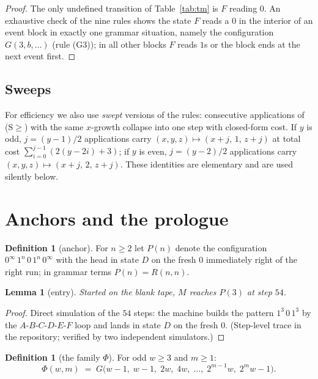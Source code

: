 \documentclass[11pt]{amsart}
\newtheorem{lemma}[theorem]{Lemma}
\theoremstyle{definition}
\newtheorem{definition}[theorem]{Definition}
\begin{document}
\begin{proof}
The only undefined transition of Table~\ref{tab:tm} is $F$ reading $0$. An
exhaustive check of the nine rules shows the state $F$ reads a $0$ in the
interior of an event block in exactly one grammar situation, namely the
configuration $G(3,b,\dots)$ (rule (G3)); in all other blocks $F$ reads
$1$s or the block ends at the next event first.
\end{proof}

\subsection{Sweeps}

For efficiency we also use \emph{swept} versions of the rules: consecutive
applications of (S$\ge$) with the same $x$-growth collapse into one step
with closed-form cost. If $y$ is odd, $j=(y-1)/2$ applications carry
$(x,y,z)\mapsto(x+j,\,1,\,z+j)$ at total cost $\sum_{i=0}^{j-1}(2(y-2i)+3)$;
if $y$ is even, $j=(y-2)/2$ applications carry $(x,y,z)\mapsto(x+j,\,2,\,z+j)$.
These identities are elementary and are used silently below.

\section{Anchors and the prologue}\label{s:prologue}

\begin{definition}[anchor]\label{def:anchor}
For $n\ge2$ let $P(n)$ denote the configuration
$0^\infty\,1^n\,0\,1^n\,0^\infty$ with the head in state $D$ on the fresh
$0$ immediately right of the right run; in grammar terms $P(n)=R(n,n)$.
\end{definition}

\begin{lemma}[entry]\label{lem:entry}
Started on the blank tape, $M$ reaches $P(3)$ at step $54$.
\end{lemma}

\begin{proof}
Direct simulation of the $54$ steps: the machine builds the pattern
$1^3\,0\,1^3$ by the $A$-$B$-$C$-$D$-$E$-$F$ loop and lands in state $D$ on
the fresh $0$. (Step-level trace in the repository; verified by two
independent simulators.)
\end{proof}

\begin{definition}[the family $\Phi$]\label{def:phi}
For odd $w\ge3$ and $m\ge1$:
\[
\Phi(w,m)\;=\;G\bigl(w-1,\;w-1,\;2w,\;4w,\;\dots,\;2^{m-1}w,\;2^{m}w-1\bigr).
\]
\end{definition}
\end{document}
